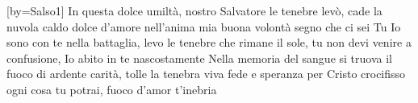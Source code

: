 [by={Salso1}]
\beginverse
In questa dolce umiltà, nostro Salvatore
le tenebre levò, cade la nuvola
caldo dolce d'amore nell'anima mia
buona volontà segno che ci sei Tu
\endverse
\beginchorus
Io sono con te nella battaglia,
levo le tenebre che rimane il sole,
tu non devi venire a confusione,
Io abito in te nascostamente
\endchorus
\beginverse
Nella memoria del sangue si truova il fuoco
di ardente carità, tolle la tenebra
viva fede e speranza per Cristo crocifisso
ogni cosa tu potrai, fuoco d'amor t'inebria
\endverse
\endsong

